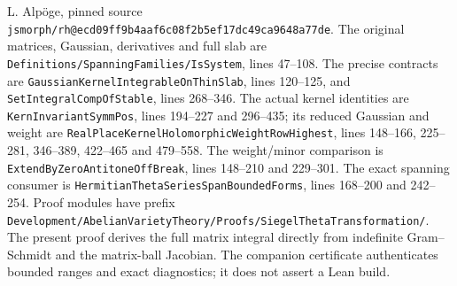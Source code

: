 L. Alp\"oge, pinned source
\texttt{jsmorph/rh@ecd09ff9b4aaf6c08f2b5ef17dc49ca9648a77de}.
The original matrices, Gaussian, derivatives and full slab are
\texttt{Definitions/SpanningFamilies/IsSystem}, lines 47--108.
The precise contracts are
\texttt{GaussianKernelIntegrableOnThinSlab}, lines 120--125, and
\texttt{SetIntegralCompOfStable}, lines 268--346.
The actual kernel identities are
\texttt{KernInvariantSymmPos}, lines 194--227 and 296--435;
its reduced Gaussian and weight are
\texttt{RealPlaceKernelHolomorphicWeightRowHighest},
lines 148--166, 225--281, 346--389, 422--465 and 479--558.
The weight/minor comparison is
\texttt{ExtendByZeroAntitoneOffBreak}, lines 148--210 and 229--301.
The exact spanning consumer is
\texttt{HermitianThetaSeriesSpanBoundedForms}, lines 168--200
and 242--254. Proof modules have prefix
\texttt{Development/AbelianVarietyTheory/Proofs/SiegelThetaTransformation/}.
The present proof derives the full matrix integral directly from
indefinite Gram--Schmidt and the matrix-ball Jacobian.
The companion certificate authenticates bounded ranges and exact
diagnostics; it does not assert a Lean build.
